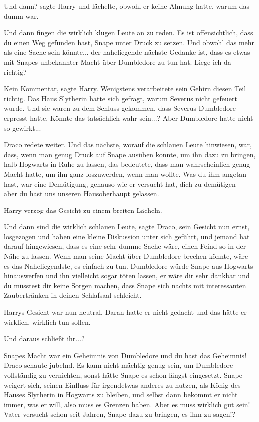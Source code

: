\glqq Und dann?\grqq{} sagte Harry und lächelte, obwohl er keine Ahnung hatte,
warum das dumm war.

\glqq Und dann fingen die wirklich klugen Leute an zu reden. Es ist
offensichtlich, dass du einen Weg gefunden hast, Snape unter Druck zu setzen.
Und obwohl das mehr als eine Sache sein könnte... der naheliegende nächste
Gedanke ist, dass es etwas mit Snapes unbekannter Macht über Dumbledore zu tun
hat. Liege ich da richtig?\grqq{}

\glqq Kein Kommentar\grqq{}, sagte Harry. Wenigstens verarbeitete sein Gehirn
diesen Teil richtig. Das Haus Slytherin hatte sich gefragt, warum Severus nicht
gefeuert wurde. Und sie waren zu dem Schluss gekommen, dass Severus Dumbledore
erpresst hatte. Könnte das tatsächlich wahr sein...? Aber Dumbledore hatte nicht
so gewirkt...

Draco redete weiter. \glqq Und das nächste, worauf die schlauen Leute hinwiesen,
war, dass, wenn man genug Druck auf Snape ausüben konnte, um ihn dazu zu
bringen, halb Hogwarts in Ruhe zu lassen, das bedeutete, dass man wahrscheinlich
genug Macht hatte, um ihn ganz loszuwerden, wenn man wollte. Was du ihm angetan
hast, war eine Demütigung, genauso wie er versucht hat, dich zu demütigen - aber
du hast uns unseren Hausoberhaupt gelassen.\grqq{}

Harry verzog das Gesicht zu einem breiten Lächeln.

\glqq Und dann sind die wirklich schlauen Leute\grqq{}, sagte Draco, sein
Gesicht nun ernst, \glqq losgezogen und haben eine kleine Diskussion unter sich
geführt, und jemand hat darauf hingewiesen, dass es eine sehr dumme Sache wäre,
einen Feind so in der Nähe zu lassen. Wenn man seine Macht über Dumbledore
brechen könnte, wäre es das Naheliegendste, es einfach zu tun. Dumbledore würde
Snape aus Hogwarts hinauswerfen und ihn vielleicht sogar töten lassen, er wäre
dir sehr dankbar und du müsstest dir keine Sorgen machen, dass Snape sich nachts
mit interessanten Zaubertränken in deinen Schlafsaal schleicht.\grqq{}

Harrys Gesicht war nun neutral. Daran hatte er nicht gedacht und das hätte er
wirklich, wirklich tun sollen.

\glqq Und daraus schließt ihr...?\grqq{}

\glqq Snapes Macht war ein Geheimnis von Dumbledore und du hast das
Geheimnis!\grqq{} Draco schaute jubelnd. \glqq Es kann nicht mächtig genug sein,
um Dumbledore vollständig zu vernichten, sonst hätte Snape es schon längst
eingesetzt. Snape weigert sich, seinen Einfluss für irgendetwas anderes zu
nutzen, als König des Hauses Slytherin in Hogwarts zu bleiben, und selbst dann
bekommt er nicht immer, was er will, also muss es Grenzen haben. Aber es muss
wirklich gut sein! Vater versucht schon seit Jahren, Snape dazu zu bringen, es
ihm zu sagen!?\grqq{}

